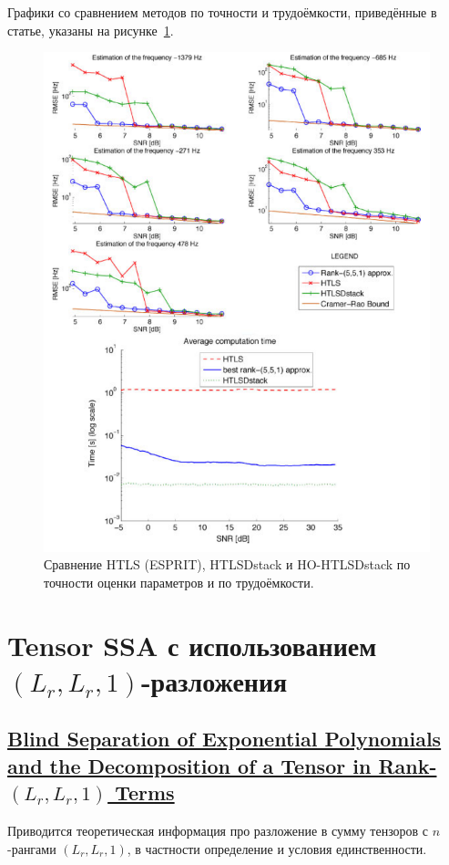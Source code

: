 \documentclass[12pt]{article}
\theoremstyle{plain}
\theoremstyle{definition}
\theoremstyle{remark}
\begin{document}
Графики со сравнением методов по точности и трудоёмкости, приведённые
в статье, указаны на рисунке~\ref{fig:papy2009}.
\begin{figure}[!ht]
  \centering
  \includegraphics[height=0.8\textheight]{papy2009_figures.png}
  \caption{Сравнение HTLS (ESPRIT), HTLSDstack и HO-HTLSDstack по
  точности оценки параметров и по трудоёмкости.}
  \label{fig:papy2009}
\end{figure}

\section{Tensor SSA с использованием \texorpdfstring{$(L_r, L_r,
1)$}{(Lr, Lr, 1)}-разложения}
\subsection{\href{https://doi.org/10.1137/100805510}{Blind Separation
    of Exponential Polynomials and the Decom\-position of a Tensor in
Rank-\texorpdfstring{$(L_r, L_r, 1)$}{(Lr, Lr, 1)} Terms}}
Приводится теоретическая информация про разложение в сумму тензоров с
$n$-рангами $(L_r, L_r, 1)$, в частности определение и условия единственности.
\end{document}
